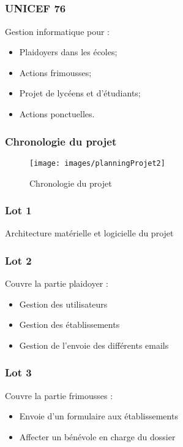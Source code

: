 \speaker{\Mathieu}
\subsection{} %



\begin{frame}
\frametitle{UNICEF 76}
Gestion informatique pour :
	\begin{itemize}
		\item Plaidoyers dans les \'ecoles;
		\item Actions frimousses;
		\item Projet de lycéens et d'étudiants;
		\item Actions ponctuelles.
	\end{itemize}
\end{frame}




\begin{frame}
	\frametitle{Chronologie du projet}
	\begin{figure}
		\begin{landscape}
		\texttt{[image: images/planningProjet2]}
		\end{landscape}
        \caption{Chronologie du projet}
	\end{figure} 
\end{frame}




\begin{frame}
	\frametitle{Lot 1}
	Architecture matérielle et logicielle du projet
\end{frame}


\speaker{\Michel}
\begin{frame}
	\frametitle{Lot 2}
	Couvre la partie plaidoyer :
	\begin{itemize}
		\item Gestion des utilisateurs
		\item Gestion des établissements
		\item Gestion de l'envoie des différents emails
	\end{itemize}
\end{frame}

\begin{frame}
	\frametitle{Lot 3}
	Couvre la partie frimousses :
	\begin{itemize}
		\item Envoie d'un formulaire aux établissements
		\item Affecter un bénévole en charge du dossier
	\end{itemize}
\end{frame}


